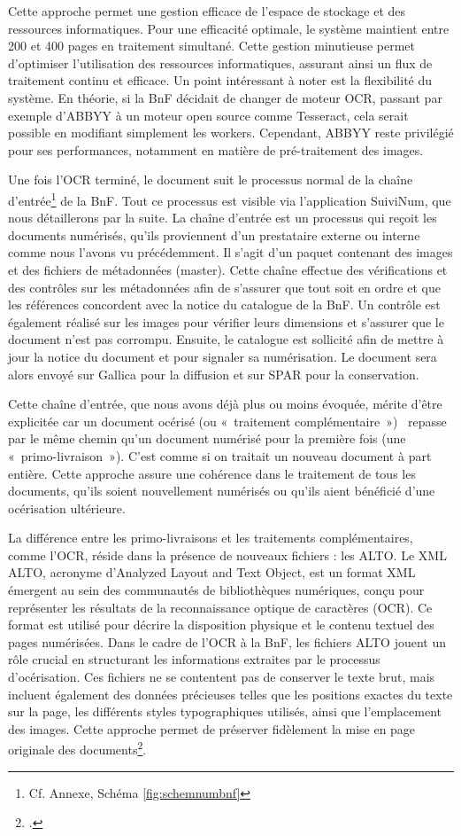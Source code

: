 \documentclass[a4paper,12pt,twoside]{book}
\begin{document}
	Cette approche permet une gestion efficace de l'espace de stockage et des ressources informatiques. Pour une efficacité optimale, le système maintient entre 200 et 400 pages en traitement simultané. Cette gestion minutieuse permet d'optimiser l'utilisation des ressources informatiques, assurant ainsi un flux de traitement continu et efficace. Un point intéressant à noter est la flexibilité du système. En théorie, si la BnF décidait de changer de moteur OCR, passant par exemple d'ABBYY à un moteur open source comme Tesseract, cela serait possible en modifiant simplement les workers. Cependant, ABBYY reste privilégié pour ses performances, notamment en matière de pré-traitement des images.
	
	Une fois l'OCR terminé, le document suit le processus normal de la chaîne d'entrée\footnote{Cf. Annexe, Schéma \ref*{fig:schemnumbnf}} de la BnF. Tout ce processus est visible via l'application SuiviNum, que nous détaillerons par la suite.
	La chaîne d'entrée est un processus qui reçoit les documents numérisés, qu'ils proviennent d'un prestataire externe ou interne comme nous l'avons vu précédemment. Il s'agit d'un paquet contenant des images et des fichiers de métadonnées (master). Cette chaîne effectue des vérifications et des contrôles sur les métadonnées afin de s'assurer que tout soit en ordre et que les références concordent avec la notice du catalogue de la BnF. Un contrôle est également réalisé sur les images pour vérifier leurs dimensions et s'assurer que le document n'est pas corrompu. Ensuite, le catalogue est sollicité afin de mettre à jour la notice du document et pour signaler sa numérisation. Le document sera alors envoyé sur Gallica pour la diffusion et sur SPAR pour la conservation.
	
	Cette chaîne d'entrée, que nous avons déjà plus ou moins évoquée, mérite d'être explicitée car un document océrisé (ou « traitement complémentaire »)  repasse par le même chemin qu'un document numérisé pour la première fois (une « primo-livraison »). C'est comme si on traitait un nouveau document à part entière. Cette approche assure une cohérence dans le traitement de tous les documents, qu'ils soient nouvellement numérisés ou qu'ils aient bénéficié d'une océrisation ultérieure.
	
	La différence entre les primo-livraisons et les traitements complémentaires, comme l’OCR, réside dans la présence de nouveaux fichiers : les ALTO. Le XML ALTO, acronyme d’Analyzed Layout and Text Object, est un format XML émergent au sein des communautés de bibliothèques numériques, conçu pour représenter les résultats de la reconnaissance optique de caractères (OCR). Ce format est utilisé pour décrire la disposition physique et le contenu textuel des pages numérisées. Dans le cadre de l’OCR à la BnF, les fichiers ALTO jouent un rôle crucial en structurant les informations extraites par le processus d’océrisation. Ces fichiers ne se contentent pas de conserver le texte brut, mais incluent également des données précieuses telles que les positions exactes du texte sur la page, les différents styles typographiques utilisés, ainsi que l’emplacement des images. Cette approche permet de préserver fidèlement la mise en page originale des documents\footcite{belaid_xml_2007}.
	
\end{document}
